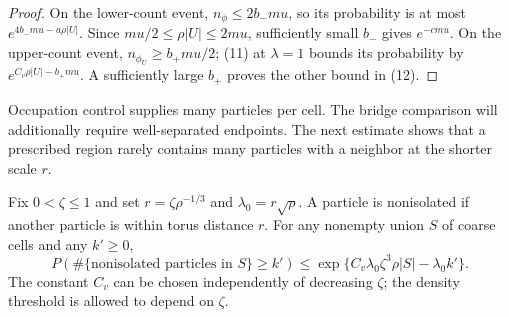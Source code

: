 \begin{proof}
On the lower-count event, $n_\phi\leq2b_-mu$, so its probability
is at most $e^{4b_-mu-a\rho|U|}$. Since
$mu/2\leq\rho|U|\leq2mu$, sufficiently small $b_-$ gives
$e^{-cmu}$. On the upper-count event,
$n_{\phi_U}\geq b_+mu/2$; (11) at $\lambda=1$ bounds its
probability by $e^{C_v\rho|U|-b_+mu}$. A sufficiently large
$b_+$ proves the other bound in (12).
\end{proof}

Occupation control supplies many particles per cell. The bridge
comparison will additionally require well-separated endpoints. The
next estimate shows that a prescribed region rarely contains many
particles with a neighbor at the shorter scale $r$.

\begin{lemma}\label{lem:isolation}
Fix $0<\zeta\leq1$ and set $r=\zeta\rho^{-1/3}$ and
$\lambda_0=r\sqrt\rho$. A particle is nonisolated if another
particle is within torus distance $r$. For any nonempty union $S$
of coarse cells and any $k'\geq0$,
\begin{equation}
 P(\#\{\text{nonisolated particles in }S\}\geq k')
 \leq\exp\{C_v\lambda_0\zeta^3\rho|S|-\lambda_0 k'\}.
 \tag{13}\label{eq:13}
\end{equation}
The constant $C_v$ can be chosen independently of decreasing
$\zeta$; the density threshold is allowed to depend on $\zeta$.
\end{lemma}

